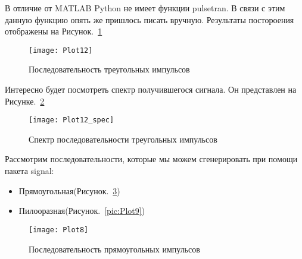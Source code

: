 
\parindent=1cm %

В отличие от MATLAB Python не имеет функции pulsetran. В связи с этим данную функцию опять же пришлось писать вручную. Результаты постороения отображены на Рисунок.~\ref{pic:Plot12}

\begin{figure}[H]
	\begin{center}
		\texttt{[image: Plot12]}
		\caption{Последовательность треугольных импульсов} 
		\label{pic:Plot12} %
	\end{center}
\end{figure}

Интересно будет посмотреть спектр получившегося сигнала. Он представлен на Рисунке.~\ref{pic:Plot12_spec}
\begin{figure}[H]
	\begin{center}
		\texttt{[image: Plot12\_spec]}
		\caption{Спектр последовательности треугольных импульсов} 
		\label{pic:Plot12_spec} %
	\end{center}
\end{figure}

Рассмотрим последовательности, которые мы можем сгенерировать при помощи пакета signal:
\begin{itemize}
\item Прямоугольная(Рисунок.~\ref{pic:Plot8})
\item Пилооразная(Рисунок.~\ref{pic:Plot9})
\end{itemize}


\parindent=1cm %
\begin{figure}[H]
	\begin{center}
		\texttt{[image: Plot8]}
		\caption{Последовательность прямоугольных импульсов} 
		\label{pic:Plot8} %
	\end{center}
\end{figure}


\parindent=1cm %

